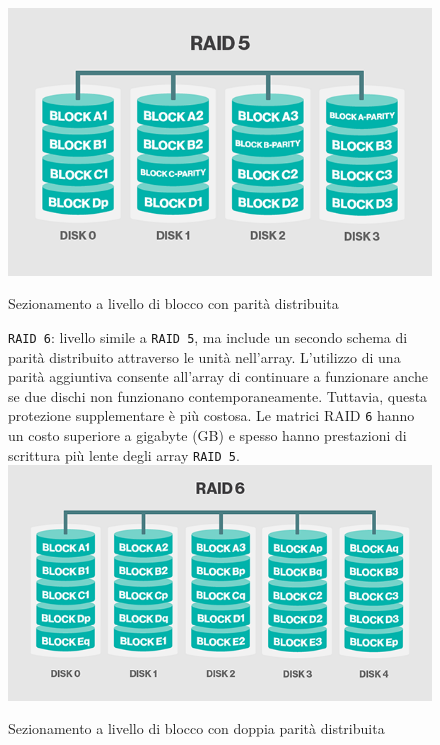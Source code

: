 \begin{itemize}
\begin{figure}[htbp]
\centering
\includegraphics[scale=0.40]{img/raid55.png}\\
\caption{Sezionamento a livello di blocco con parit\`{a} distribuita\label{figura1.9} \cite{etichetta9}}
\end{figure}

\begin{figure}[htbp]
\item
\verb"RAID 6": livello simile a \verb"RAID 5", ma include un secondo schema di parit\`{a} distribuito attraverso le unit\`{a} nell'array. L'utilizzo di una parit\`{a} aggiuntiva consente all'array di continuare a funzionare anche se due dischi non funzionano contemporaneamente. Tuttavia, questa protezione supplementare \`{e} pi\`{u} costosa. Le matrici RAID \verb"6" hanno un costo superiore a gigabyte (GB) e spesso hanno prestazioni di scrittura pi\`{u} lente degli array \verb"RAID 5".\cite{etichetta9}\\

\centering
\includegraphics[scale=0.40]{img/raid66.png}\\
\caption{Sezionamento a livello di blocco con doppia parit\`{a} distribuita\label{figura1.10} \cite{etichetta9}}
\end{figure}
\end{itemize}


